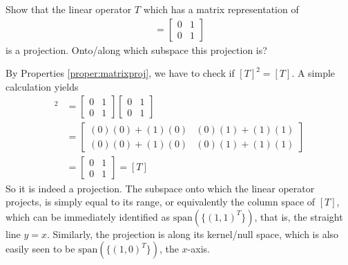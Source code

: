 \begin{exmp}
\label{exmp:xyproj}
Show that the linear operator $T$ which has a matrix representation of
\begin{align*}
[T] =
\begin{bmatrix}
0 & 1 \\
0 & 1 
\end{bmatrix}
\end{align*}
is a projection. Onto/along which subspace this projection is? 
\end{exmp}
\begin{solution}
By Properties \ref{proper:matrixproj}, we have to check if $[T]^2 = [T]$. A simple calculation yields
\begin{align*}
[T]^2 &=
\begin{bmatrix}
0 & 1 \\
0 & 1 
\end{bmatrix}
\begin{bmatrix}
0 & 1 \\
0 & 1 
\end{bmatrix} \\
&= 
\begin{bmatrix}
(0)(0) + (1)(0) & (0)(1) + (1)(1) \\
(0)(0) + (1)(0) & (0)(1) + (1)(1)
\end{bmatrix} \\
&= 
\begin{bmatrix}
0 & 1 \\
0 & 1 
\end{bmatrix} = [T]
\end{align*}
So it is indeed a projection. The subspace onto which the linear operator projects, is simply equal to its range, or equivalently the column space of $[T]$, which can be immediately identified as $\text{span}(\{(1,1)^T\})$, that is, the straight line $y=x$. Similarly, the projection is along its kernel/null space, which is also easily seen to be $\text{span}(\{(1,0)^T\})$, the $x$-axis.\\
\end{solution}

